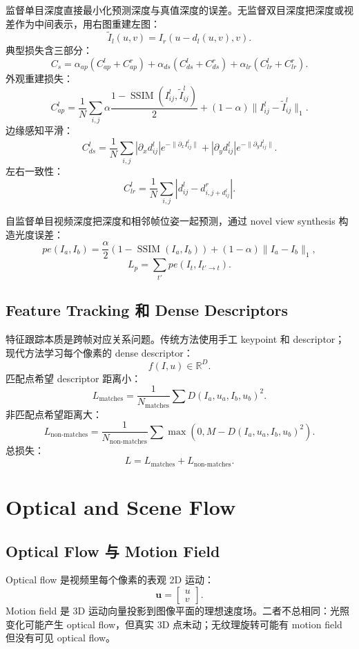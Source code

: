 \documentclass[11pt]{article}
\newcommand{\R}{\mathbb{R}}
\begin{document}
监督单目深度直接最小化预测深度与真值深度的误差。无监督双目深度把深度或视差作为中间表示，用右图重建左图：
\[
  \tilde I_l(u,v)=I_r(u-d_l(u,v),v).
\]
典型损失含三部分：
\[
  C_s=\alpha_{ap}(C^l_{ap}+C^r_{ap})
  +\alpha_{ds}(C^l_{ds}+C^r_{ds})
  +\alpha_{lr}(C^l_{lr}+C^r_{lr}).
\]
外观重建损失：
\[
  C^l_{ap}=
  \frac{1}{N}\sum_{i,j}
  \alpha\frac{1-\operatorname{SSIM}(I^l_{ij},\tilde I^l_{ij})}{2}
  +(1-\alpha)\|I^l_{ij}-\tilde I^l_{ij}\|_1.
\]
边缘感知平滑：
\[
  C^l_{ds}=
  \frac{1}{N}\sum_{i,j}
  |\partial_x d^l_{ij}|e^{-\|\partial_x I^l_{ij}\|}
  +
  |\partial_y d^l_{ij}|e^{-\|\partial_y I^l_{ij}\|}.
\]
左右一致性：
\[
  C^l_{lr}=
  \frac{1}{N}\sum_{i,j}
  |d^l_{ij}-d^r_{i,j+d^l_{ij}}|.
\]

自监督单目视频深度把深度和相邻帧位姿一起预测，通过 novel view synthesis 构造光度误差：
\[
  pe(I_a,I_b)=
  \frac{\alpha}{2}(1-\operatorname{SSIM}(I_a,I_b))
  +(1-\alpha)\|I_a-I_b\|_1,
\]
\[
  L_p=\sum_{t'}pe(I_t,I_{t'\rightarrow t}).
\]

\subsection{Feature Tracking 和 Dense Descriptors}

特征跟踪本质是跨帧对应关系问题。传统方法使用手工 keypoint 和 descriptor；现代方法学习每个像素的 dense descriptor：
\[
  f(I,u)\in\R^D.
\]
匹配点希望 descriptor 距离小：
\[
  L_{\text{matches}}=
  \frac{1}{N_{\text{matches}}}
  \sum D(I_a,u_a,I_b,u_b)^2.
\]
非匹配点希望距离大：
\[
  L_{\text{non-matches}}=
  \frac{1}{N_{\text{non-matches}}}
  \sum \max(0,M-D(I_a,u_a,I_b,u_b)^2).
\]
总损失：
\[
  L=L_{\text{matches}}+L_{\text{non-matches}}.
\]

\section{Optical and Scene Flow}

\subsection{Optical Flow 与 Motion Field}

Optical flow 是视频里每个像素的表观 2D 运动：
\[
  \bm u=
  \begin{bmatrix}
    u\\v
  \end{bmatrix}.
\]
Motion field 是 3D 运动向量投影到图像平面的理想速度场。二者不总相同：光照变化可能产生 optical flow，但真实 3D 点未动；无纹理旋转可能有 motion field 但没有可见 optical flow。
\end{document}
